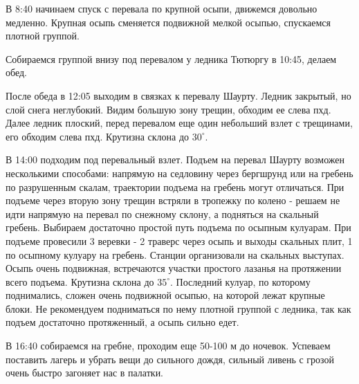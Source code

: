 В 8:40 начинаем спуск с перевала по крупной осыпи, движемся довольно медленно. Крупная осыпь сменяется подвижной мелкой осыпью, спускаемся плотной группой.

Собираемся группой внизу под перевалом у ледника Тютюргу в 10:45, делаем обед.

После обеда в 12:05 выходим в связках к перевалу Шаурту. Ледник закрытый, но слой снега неглубокий. Видим большую зону трещин, обходим ее слева пхд. Далее ледник плоский, перед перевалом еще один небольший взлет с трещинами, его обходим слева пхд. Крутизна склона до $30^\circ$.

В 14:00 подходим под перевальный взлет. Подъем на перевал Шаурту возможен несколькими способами: напрямую на седловину через бергшрунд или на гребень по разрушенным скалам, траектории подъема на гребень могут отличаться. При подъеме через вторую зону трещин встряли в тропежку по колено - решаем не идти напрямую на перевал по снежному склону, а подняться на скальный гребень. Выбираем достаточно простой путь подъема по осыпным кулуарам. При подъеме провесили 3 веревки - 2 траверс через осыпь и выходы скальных плит, 1 по осыпному кулуару на гребень. Станции организовали на скальных выступах. Осыпь очень подвижная, встречаются участки простого лазанья на протяжении всего подъема. Крутизна склона до $35^\circ$. Последний кулуар, по которому поднимались, сложен очень подвижной осыпью, на которой лежат крупные блоки. Не рекомендуем подниматься по нему плотной группой с ледника, так как подъем достаточно протяженный, а осыпь сильно едет.

В 16:40 собираемся на гребне, проходим еще 50-100 м до ночевок. Успеваем поставить лагерь и убрать вещи до сильного дождя, сильный ливень с грозой очень быстро загоняет нас в палатки.







